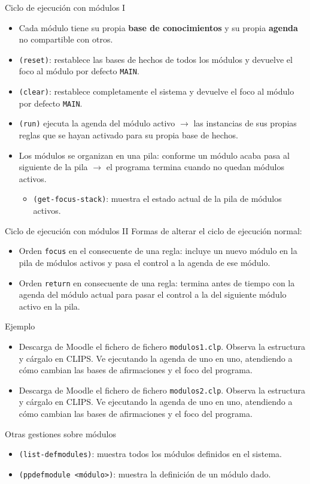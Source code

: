 \documentclass[usenames,dvipsnames,aspectratio=169]{beamer}
\begin{document}
\begin{frame}{Ciclo de ejecución con módulos I}
	\begin{itemize}
		\item Cada módulo tiene su propia \textbf{base de conocimientos} y su propia \textbf{agenda} no compartible con otros.
		\item \texttt{(reset)}: restablece las bases de hechos de todos los módulos y devuelve el foco al módulo por defecto \texttt{MAIN}.
		\item \texttt{(clear)}: restablece completamente el sistema y devuelve el foco al módulo por defecto \texttt{MAIN}.
		\item \texttt{(run)} ejecuta la agenda del módulo activo $\rightarrow$ las instancias de sus propias reglas que se hayan activado para su propia base de hechos.
		\item Los módulos se organizan en una pila: conforme un módulo acaba pasa al siguiente de la pila $\rightarrow$ el programa termina cuando no quedan módulos activos.
		\begin{itemize}
			\item \texttt{(get-focus-stack)}: muestra el estado actual de la pila de módulos activos.
		\end{itemize}
	\end{itemize}
\end{frame}

\begin{frame}{Ciclo de ejecución con módulos II}
	Formas de alterar el ciclo de ejecución normal:
	\begin{itemize}
		\item Orden \texttt{focus} en el consecuente de una regla: incluye un nuevo módulo en la pila de módulos activos y pasa el control a la agenda de ese módulo.
		\item Orden \texttt{return} en consecuente de una regla: termina antes de tiempo con la agenda del módulo actual para pasar el control a la del siguiente módulo activo en la pila.
	\end{itemize}
\end{frame}

\begin{frame}{Ejemplo}
	\begin{itemize}
		\item Descarga de Moodle el fichero de fichero \texttt{modulos1.clp}. Observa la estructura y cárgalo en CLIPS. Ve ejecutando la agenda de uno en uno, atendiendo a cómo cambian las bases de afirmaciones y el foco del programa.
		\item Descarga de Moodle el fichero de fichero \texttt{modulos2.clp}. Observa la estructura y cárgalo en CLIPS. Ve ejecutando la agenda de uno en uno, atendiendo a cómo cambian las bases de afirmaciones y el foco del programa.
	\end{itemize}
\end{frame}

\begin{frame}{Otras gestiones sobre módulos}
	\begin{itemize}
		\item \texttt{(list-defmodules)}: muestra todos los módulos definidos en el sistema.
		\item \texttt{(ppdefmodule <módulo>)}: muestra la definición de un módulo dado.
	\end{itemize}
\end{frame}

\begin{frame}
\titlepage
\end{frame}
\end{document}
